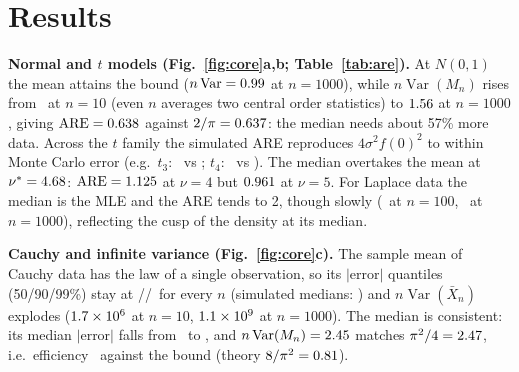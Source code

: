 \documentclass[10pt,a4paper]{article}
\newcommand{\Var}{\operatorname{Var}}
\newcommand{\ARE}{\operatorname{ARE}}
\begin{document}
\begin{table}[H]
\centering\footnotesize\setlength{\tabcolsep}{4.2pt}
\caption{Efficiency of the mean and the median ($B=\Bmain$). Bold: median more efficient. $^{\ddagger}$CRLB$/(n\Var)$ at $n=1000$; entries marginally above 1 are Monte Carlo noise. ``--'': $\Var(\bar X_n)=\infty$, so the simulated ratio is meaningless.}
\label{tab:are}

\end{table}

\section{Results}
\textbf{Normal and $t$ models (Fig.~\ref{fig:core}a,b; Table~\ref{tab:are}).} At $N(0,1)$ the mean attains the bound ($n\Var=\nvarMeanNormalThousand$ at $n=1000$), while $n\Var(M_n)$ rises from \nvarMedNormalTen\ at $n=10$ (even $n$ averages two central order statistics) to $1.56$ at $n=1000$, giving $\ARE=\areNormalSim$ against $2/\pi=0.637$: the median needs about 57\% more data. Across the $t$ family the simulated ARE reproduces $4\sigma^2f(0)^2$ to within Monte Carlo error (e.g.\ $t_3$: \areTthreeSim\ vs \areTthreeThy; $t_4$: \areTfourSim\ vs \areTfourThy). The median overtakes the mean at $\nu^*=4.68$: $\ARE=\areTfourThy$ at $\nu=4$ but $0.961$ at $\nu=5$. For Laplace data the median is the MLE and the ARE tends to 2, though slowly (\areLapHundred\ at $n=100$, \areLapThousand\ at $n=1000$), reflecting the cusp of the density at its median.

\textbf{Cauchy and infinite variance (Fig.~\ref{fig:core}c).} The sample mean of Cauchy data has the law of a single observation, so its $|\text{error}|$ quantiles (50/90/99\%) stay at \cauchyQFiftyThy/\cauchyQNinetyThy/\cauchyQNinetyNineThy\ for every $n$ (simulated medians: \cauchyMeanQfiftyRange) and $n\Var(\bar X_n)$ explodes (\ensuremath{\cauchyMeanNvarTen} at $n=10$, \ensuremath{\cauchyMeanNvarThousand} at $n=1000$). The median is consistent: its median $|\text{error}|$ falls from \cauchyMedQfiftyTen\ to \cauchyMedQfiftyThousand, and $n\Var(M_n)=\cauchyMedNvarThousand$ matches $\pi^2/4=2.47$, i.e.\ efficiency \cauchyEffMed\ against the bound (theory $8/\pi^2=0.81$).
\end{document}
